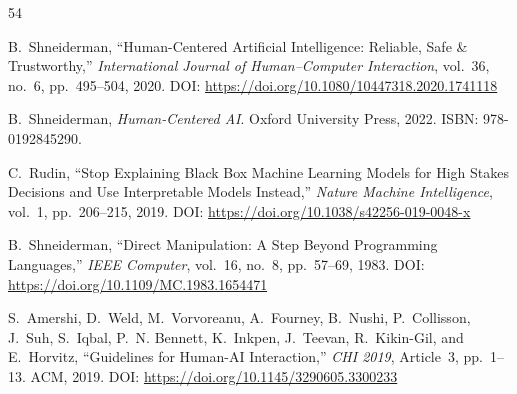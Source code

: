 \documentclass[acmlarge,nonacm,screen]{acmart}
\begin{document}
\begin{thebibliography}{54}

B.~Shneiderman,
``Human-Centered Artificial Intelligence: Reliable, Safe \& Trustworthy,''
\textit{International Journal of Human--Computer Interaction}, vol.~36, no.~6, pp.~495--504, 2020.
\newline DOI: \url{https://doi.org/10.1080/10447318.2020.1741118}

B.~Shneiderman,
\textit{Human-Centered AI}.
Oxford University Press, 2022. ISBN: 978-0192845290.


C.~Rudin,
``Stop Explaining Black Box Machine Learning Models for High Stakes Decisions and Use Interpretable Models Instead,''
\textit{Nature Machine Intelligence}, vol.~1, pp.~206--215, 2019.
\newline DOI: \url{https://doi.org/10.1038/s42256-019-0048-x}


B.~Shneiderman,
``Direct Manipulation: A Step Beyond Programming Languages,''
\textit{IEEE Computer}, vol.~16, no.~8, pp.~57--69, 1983.
\newline DOI: \url{https://doi.org/10.1109/MC.1983.1654471}


S.~Amershi, D.~Weld, M.~Vorvoreanu, A.~Fourney, B.~Nushi, P.~Collisson, J.~Suh, S.~Iqbal, P.~N. Bennett, K.~Inkpen, J.~Teevan, R.~Kikin-Gil, and E.~Horvitz,
``Guidelines for Human-AI Interaction,''
\textit{CHI 2019}, Article~3, pp.~1--13. ACM, 2019.
\newline DOI: \url{https://doi.org/10.1145/3290605.3300233}


\end{thebibliography}
\end{document}
